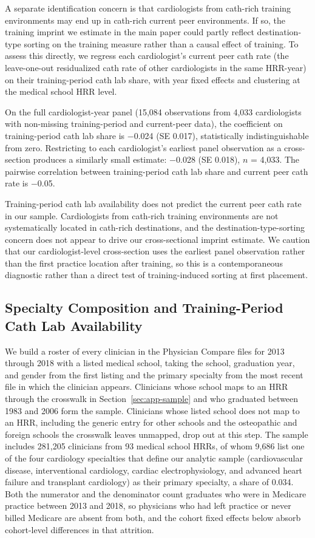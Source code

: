 \documentclass[12pt]{article}
\begin{document}
A separate identification concern is that cardiologists from cath-rich training environments may end up in cath-rich current peer environments. If so, the training imprint we estimate in the main paper could partly reflect destination-type sorting on the training measure rather than a causal effect of training. To assess this directly, we regress each cardiologist's current peer cath rate (the leave-one-out residualized cath rate of other cardiologists in the same HRR-year) on their training-period cath lab share, with year fixed effects and clustering at the medical school HRR level.

On the full cardiologist-year panel (15,084 observations from 4,033 cardiologists with non-missing training-period and current-peer data), the coefficient on training-period cath lab share is $-$0.024 (SE 0.017), statistically indistinguishable from zero. Restricting to each cardiologist's earliest panel observation as a cross-section produces a similarly small estimate: $-$0.028 (SE 0.018), $n$ = 4,033. The pairwise correlation between training-period cath lab share and current peer cath rate is $-$0.05.

Training-period cath lab availability does not predict the current peer cath rate in our sample. Cardiologists from cath-rich training environments are not systematically located in cath-rich destinations, and the destination-type-sorting concern does not appear to drive our cross-sectional imprint estimate. We caution that our cardiologist-level cross-section uses the earliest panel observation rather than the first practice location after training, so this is a contemporaneous diagnostic rather than a direct test of training-induced sorting at first placement.

\subsection{Specialty Composition and Training-Period Cath Lab Availability}\label{sec:app-composition}

We build a roster of every clinician in the Physician Compare files for 2013 through 2018 with a listed medical school, taking the school, graduation year, and gender from the first listing and the primary specialty from the most recent file in which the clinician appears. Clinicians whose school maps to an HRR through the crosswalk in Section~\ref{sec:app-sample} and who graduated between 1983 and 2006 form the sample. Clinicians whose listed school does not map to an HRR, including the generic entry for other schools and the osteopathic and foreign schools the crosswalk leaves unmapped, drop out at this step. The sample includes 281,205 clinicians from 93 medical school HRRs, of whom 9,686 list one of the four cardiology specialties that define our analytic sample (cardiovascular disease, interventional cardiology, cardiac electrophysiology, and advanced heart failure and transplant cardiology) as their primary specialty, a share of 0.034. Both the numerator and the denominator count graduates who were in Medicare practice between 2013 and 2018, so physicians who had left practice or never billed Medicare are absent from both, and the cohort fixed effects below absorb cohort-level differences in that attrition.
\end{document}
